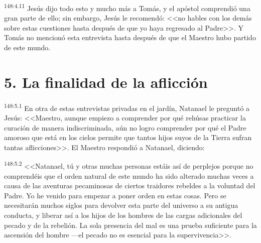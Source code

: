 \par 
\textsuperscript{148:4.11} Jesús dijo todo esto y mucho más a Tomás, y el apóstol comprendió una gran parte de ello; sin embargo, Jesús le recomendó: <<no hables con los demás sobre estas cuestiones hasta después de que yo haya regresado al Padre>>. Y Tomás no mencionó esta entrevista hasta después de que el Maestro hubo partido de este mundo.

\section*{5. La finalidad de la aflicción}
\par 
\textsuperscript{148:5.1} En otra de estas entrevistas privadas en el jardín, Natanael le preguntó a Jesús: <<Maestro, aunque empiezo a comprender por qué rehúsas practicar la curación de manera indiscriminada, aún no logro comprender por qué el Padre amoroso que está en los cielos permite que tantos hijos suyos de la Tierra sufran tantas aflicciones>>. El Maestro respondió a Natanael, diciendo:

\par 
\textsuperscript{148:5.2} <<Natanael, tú y otras muchas personas estáis así de perplejos porque no comprendéis que el orden natural de este mundo ha sido alterado muchas veces a causa de las aventuras pecaminosas de ciertos traidores rebeldes a la voluntad del Padre. Yo he venido para empezar a poner orden en estas cosas. Pero se necesitarán muchos siglos para devolver esta parte del universo a su antigua conducta, y liberar así a los hijos de los hombres de las cargas adicionales del pecado y de la rebelión. La sola presencia del mal es una prueba suficiente para la ascensión del hombre ---el pecado no es esencial para la supervivencia>>.

